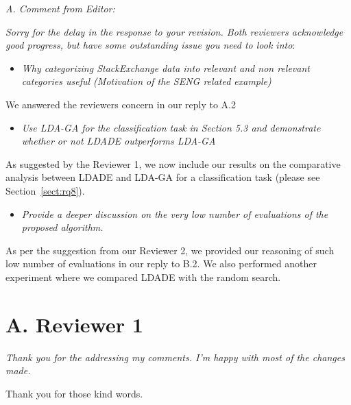 \documentclass[twocolumn,5p,sort&compress]{elsarticle}
\newcommand{\bi}{\begin{itemize}}
\newcommand{\ei}{\end{itemize}}
\theoremstyle{break}
\begin{document}
\noindent
\textit{A. Comment from Editor:}

{\em Sorry for the delay in the response to your revision. Both reviewers acknowledge good progress, but have some outstanding issue you need to look into}:

\bi
\item {\em Why categorizing StackExchange data into relevant and non relevant categories useful (Motivation of the SENG related example)\\}
\ei
We answered the reviewers concern in our reply to A.2\\

\bi
\item {\em Use LDA-GA for the classification task in Section 5.3 and demonstrate whether or not LDADE outperforms LDA-GA\\}
\ei
As suggested by the Reviewer 1, we now include our results on the comparative analysis between LDADE and LDA-GA for a classification task (please see Section~\ref{sect:rq8}).

\bi
\item {\em Provide a deeper discussion on the very low number of evaluations of the proposed algorithm.\\}
\ei
As per the suggestion from our Reviewer 2, we provided our reasoning of such low number of evaluations in our reply to B.2. We also performed another experiment where we compared LDADE with the random search.\\


\newpage
\section*{A. Reviewer 1}

\textit{Thank you for the addressing my comments. I'm happy with most of the changes made.\\}

Thank you for those kind words.\\
\end{document}
